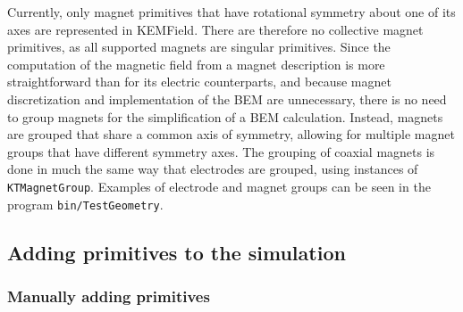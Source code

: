 \documentclass[11pt,a4paper,oneside]{article}
\newcommand{\kemfield}    {{\sc KEMField}}
\begin{document}
Currently, only magnet primitives that have rotational symmetry about one of its axes are represented in \kemfield .  There are therefore no collective magnet primitives, as all supported magnets are singular primitives.  Since the computation of the magnetic field from a magnet description is more straightforward than for its electric counterparts, and because magnet discretization and implementation of the BEM are unnecessary, there is no need to group magnets for the simplification of a BEM calculation.  Instead, magnets are grouped that share a common axis of symmetry, allowing for multiple magnet groups that have different symmetry axes.  The grouping of coaxial magnets is done in much the same way that electrodes are grouped, using instances of \texttt{KTMagnetGroup}.  Examples of electrode and magnet groups can be seen in the program \texttt{bin/TestGeometry}.

\subsection{Adding primitives to the simulation}
\label{subsec:addingPrimitives}

\subsubsection{Manually adding primitives}
\label{subsubsec:manuallyAddingPrimitives}
\end{document}
